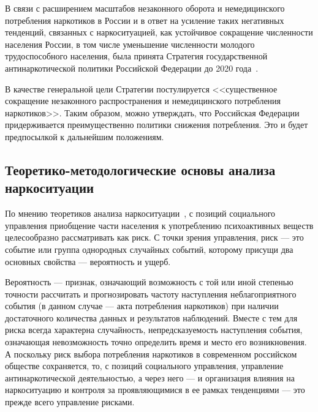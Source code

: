 В связи с расширением масштабов незаконного оборота и немедицинского потребления 
наркотиков  в России и в ответ на усиление таких негативных тенденций, связанных 
с наркоситуацией, как устойчивое сокращение численности населения России, в том 
числе уменьшение численности молодого трудоспособного населения, была принята 
Стратегия государственной антинаркотической политики
Российской Федерации до 2020 года~\cite{ru_nat_drug_strat}. 

В качестве генеральной цели Стратегии постулируется <<существенное сокращение 
незаконного распространения и немедицинского потребления наркотиков>>. Таким 
образом, можно утверждать, что Российская Федерации придерживается 
преимущественно политики снижения потребления. Это и будет предпосылкой к 
дальнейшим положениям.

\subsection{Теоретико-методологические основы анализа наркоситуации}

По мнению теоретиков анализа наркоситуации~\cite{Karpets2010}, с позиций
социального управления приобщение части населения к употреблению психоактивных
веществ целесообразно рассматривать как риск. С точки зрения управления, риск
–-- это событие или группа однородных случайных событий, которому присущи два
основных свойства --– вероятность и ущерб.

Вероятность –-- признак, означающий возможность с той или иной степенью точности
рассчитать и прогнозировать частоту наступления неблагоприятного события (в
данном случае --– акта потребления наркотиков) при наличии достаточного
количества данных и результатов наблюдений. Вместе с тем для риска всегда
характерна случайность, непредсказуемость наступления события, означающая
невозможность точно определить время и место его возникновения. А поскольку риск
выбора потребления наркотиков в современном российском обществе сохраняется, то,
с позиций социального управления, управление антинаркотической деятельностью, а
через него –-- и организация влияния на наркоситуацию и контроля за
проявляющимися в ее рамках тенденциями –-- это прежде всего управление рисками.

